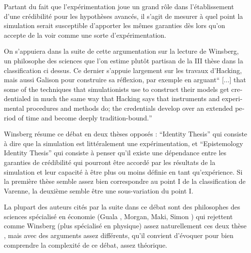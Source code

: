 
Partant du fait que l'expérimentation joue un grand rôle dans l'établissement d'une crédibilité pour les hypothèses avancés, il s'agit de mesurer à quel point la simulation serait susceptible d'apporter les mêmes garanties dès lors qu'on accepte de la voir comme une sorte d'expérimentation.

On s'appuiera dans la suite de cette argumentation sur la lecture de Winsberg, un philosophe des sciences que l'on estime plutôt partisan de la III thèse dans la classification ci dessus. Ce dernier s'appuie largement sur les travaux d'Hacking, mais aussi Galison pour construire sa réflexion, par exemple en arguant\foreignquote{english}{ [...] that some of the techniques that simulationists use to construct their models get credentialed in much the same way that Hacking says that instruments and experimental procedures and methods do; the credentials develop over an extended period of time and become deeply tradition-bound.} \autocites{Winsberg2003, Winsberg2013} 

Winsberg résume ce débat en deux thèses opposés : \foreignquote{english}{Identity Thesis} qui consiste à dire que la simulation est littéralement une expérimentation, et \foreignquote{english}{Epistemology Identity Thesis} qui consiste à penser qu'il existe une dépendance entre les garanties de crédibilité qui pourront être accordé par les résultats de la simulation et leur capacité à être plus ou moins définie en tant qu'expérience. Si la première thèse semble assez bien correspondre au point I de la classification de Varenne, la deuxième semble être une sous-variation du point I.

La plupart des auteurs cités par la suite dans ce débat sont des philosophes des sciences spécialisé en économie (Guala , Morgan, Maki, Simon ) qui rejettent comme Winsberg (plus spécialisé en physique) assez naturellement ces deux thèse \autocite{Winsberg2009}, mais avec des arguments assez différents, qu'il convient d'évoquer pour bien comprendre la complexité de ce débat, assez théorique. 

